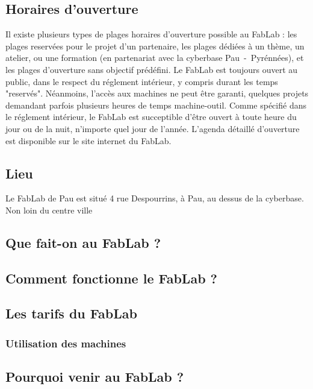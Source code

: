 \subsection{Horaires d'ouverture}
Il existe plusieurs types de plages horaires d'ouverture possible au FabLab : les plages reservées pour le projet d'un partenaire, les plages dédiées à un thème, un atelier, ou une formation (en partenariat avec la cyberbase Pau~-~Pyrénnées), et les plages d'ouverture sans objectif prédéfini.
Le FabLab est toujours ouvert au public, dans le respect du réglement intérieur, y compris durant les temps "reservés". Néanmoins, l'accès aux machines ne peut être garanti, quelques projets demandant parfois plusieurs heures de temps machine-outil.
Comme spécifié dans le réglement intérieur, le FabLab est succeptible d'être ouvert à toute heure du jour ou de la nuit, n'importe quel jour de l'année.
L'agenda détaillé d'ouverture est disponible sur le site internet du FabLab. %

\subsection{Lieu}
Le FabLab de Pau est situé 4 rue Despourrins, à Pau, au dessus de la cyberbase. Non loin du centre ville
\subsection{Que fait-on au FabLab ?}
\subsection{Comment fonctionne le FabLab ?}

\subsection{Les tarifs du FabLab}

\subsubsection{Utilisation des machines}

\subsection{Pourquoi venir au FabLab ?}
